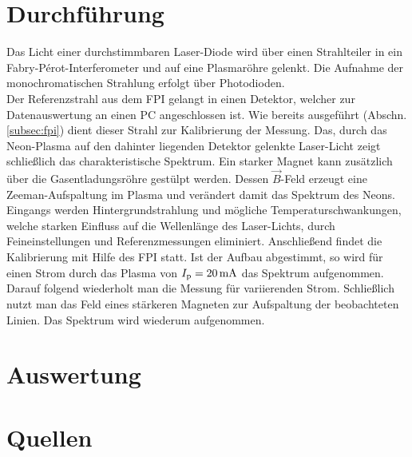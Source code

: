 \documentclass[numbers=noenddot,12pt,a4paper]{scrartcl}
\newcommand{\ix}[1]{_\text{#1}}
\begin{document}
\section{Durchführung}\label{subsec:durch}
Das Licht einer durchstimmbaren Laser-Diode wird über einen Strahlteiler in ein Fabry-Pérot-Interferometer und auf eine Plasmaröhre gelenkt. Die Aufnahme der monochromatischen Strahlung erfolgt über Photodioden.\\
Der Referenzstrahl aus dem FPI gelangt in einen Detektor, welcher zur Datenauswertung an einen PC angeschlossen ist. Wie bereits ausgeführt (Abschn. \ref{subsec:fpi}) dient dieser Strahl zur Kalibrierung der Messung. Das, durch das Neon-Plasma auf den dahinter liegenden Detektor gelenkte Laser-Licht zeigt schließlich das charakteristische Spektrum. Ein starker Magnet kann zusätzlich über die Gasentladungsröhre gestülpt werden. Dessen $\vec{B}$-Feld erzeugt eine Zeeman-Aufspaltung im Plasma und verändert damit das Spektrum des Neons.\\
Eingangs werden Hintergrundstrahlung und mögliche Temperaturschwankungen, welche starken Einfluss auf die Wellenlänge des Laser-Lichts, durch Feineinstellungen und Referenzmessungen eliminiert. Anschließend findet die Kalibrierung mit Hilfe des FPI statt. Ist der Aufbau abgestimmt, so wird für einen Strom durch das Plasma von $I\ix{p}=\unit[20]{mA}$ das Spektrum aufgenommen. Darauf folgend wiederholt man die Messung für variierenden Strom. Schließlich nutzt man das Feld eines stärkeren Magneten zur Aufspaltung der beobachteten Linien. Das Spektrum wird wiederum aufgenommen.
\section{Auswertung}
\section{Quellen}
\end{document}
